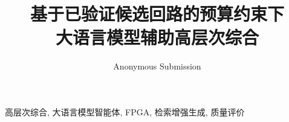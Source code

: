 \documentclass[conference]{IEEEtran}
\begin{document}
\title{基于已验证候选回路的预算约束下\\大语言模型辅助高层次综合}

\author{Anonymous Submission}

\maketitle

\begin{abstract}

\end{abstract}

\begin{IEEEkeywords}
高层次综合, 大语言模型智能体, FPGA, 检索增强生成, 质量评价
\end{IEEEkeywords}










\clearpage

\end{document}
